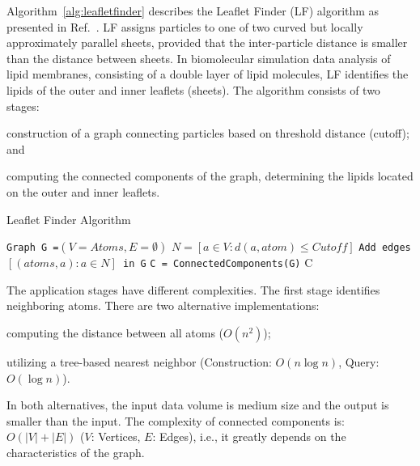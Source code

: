 Algorithm~\ref{alg:leafletfinder} describes the Leaflet Finder (LF) algorithm as
presented in Ref.~\cite{michaud2011mdanalysis}. LF assigns particles to one of
two curved but locally approximately parallel sheets, provided that the
inter-particle distance is smaller than the distance between sheets. In
biomolecular simulation data analysis of lipid membranes, consisting of a double
layer of lipid molecules, LF identifies the lipids of the outer and inner
leaflets (sheets). The algorithm consists of two stages:
\begin{inparaenum}[a)]
    \item construction of a graph connecting particles based on threshold
    distance (cutoff); and
    \item computing the connected components of the graph, determining the
    lipids located on the outer and inner leaflets.
\end{inparaenum}

\begin{algorithm}[t]
    \scriptsize
    \caption{Leaflet Finder Algorithm}
    \label{alg:leafletfinder}
    \begin{algorithmic}[1]
        \State \texttt{Graph G =$(V=Atoms,E=\emptyset)$}
        \State \texttt{$N = [a\in V: d(a,atom)\le Cutoff]$}
        \State \texttt{Add edges $[(atoms,a): a \in N]$ in G}
        \EndFor
        \State \texttt{C = ConnectedComponents(G)}
        \State \Return C
        \EndProcedure
    \end{algorithmic}
\end{algorithm}

The application stages have different complexities. The first stage identifies
neighboring atoms. There are two alternative implementations:
\begin{inparaenum}[i)]
    \item computing the distance between all atoms ($O(n^2)$);
    \item utilizing a tree-based nearest neighbor (Construction: $O(n\log n)$,
    Query: $O(\log n)$).
\end{inparaenum}
In both alternatives, the input data volume is medium size and the output is
smaller than the input. The complexity of connected components is: $O(|V|+|E|)$
($V$: Vertices, $E$: Edges), i.e., it greatly depends on the characteristics of
the graph.

